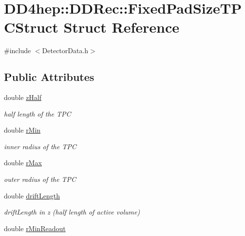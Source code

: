 \hypertarget{struct_d_d4hep_1_1_d_d_rec_1_1_fixed_pad_size_t_p_c_struct}{
\section{DD4hep::DDRec::FixedPadSizeTPCStruct Struct Reference}
\label{struct_d_d4hep_1_1_d_d_rec_1_1_fixed_pad_size_t_p_c_struct}
}


{\ttfamily \#include $<$DetectorData.h$>$}\subsection*{Public Attributes}
\begin{DoxyCompactItemize}
\item 
double \hyperlink{struct_d_d4hep_1_1_d_d_rec_1_1_fixed_pad_size_t_p_c_struct_a0985275f7d588c0b441a95ea09706328}{zHalf}
\begin{DoxyCompactList}\small\item\em half length of the TPC \item\end{DoxyCompactList}\item 
double \hyperlink{struct_d_d4hep_1_1_d_d_rec_1_1_fixed_pad_size_t_p_c_struct_af756bdcb676af4d4fb3b02d7fb8024a8}{rMin}
\begin{DoxyCompactList}\small\item\em inner radius of the TPC \item\end{DoxyCompactList}\item 
double \hyperlink{struct_d_d4hep_1_1_d_d_rec_1_1_fixed_pad_size_t_p_c_struct_a623ee3ca76535b9c0ec2fe6c3e1ce415}{rMax}
\begin{DoxyCompactList}\small\item\em outer radius of the TPC \item\end{DoxyCompactList}\item 
double \hyperlink{struct_d_d4hep_1_1_d_d_rec_1_1_fixed_pad_size_t_p_c_struct_ac71f3e69ce1a9466cadb912e80d11500}{driftLength}
\begin{DoxyCompactList}\small\item\em driftLength in z (half length of active volume) \item\end{DoxyCompactList}\item 
double \hyperlink{struct_d_d4hep_1_1_d_d_rec_1_1_fixed_pad_size_t_p_c_struct_abde215fe45dde9a8bfdbc46499d8daad}{rMinReadout}

\end{DoxyCompactItemize}
